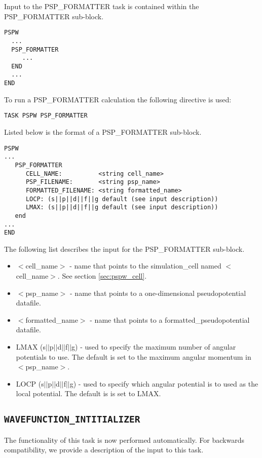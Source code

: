 Input to the PSP\_FORMATTER task is contained
within the PSP\_FORMATTER sub-block.
\begin{verbatim}
PSPW
  ...
  PSP_FORMATTER
     ...
  END
  ...
END
\end{verbatim}
To run a PSP\_FORMATTER calculation the following directive is used:
\begin{verbatim}
TASK PSPW PSP_FORMATTER
\end{verbatim}
Listed below is the format of a PSP\_FORMATTER sub-block.
\begin{verbatim}
PSPW
... 
   PSP_FORMATTER
      CELL_NAME:          <string cell_name> 
      PSP_FILENAME:       <string psp_name>
      FORMATTED_FILENAME: <string formatted_name>
      LOCP: (s||p||d||f||g default (see input description))
      LMAX: (s||p||d||f||g default (see input description))
   end
...
END
\end{verbatim}
The following list describes the input for the PSP\_FORMATTER
sub-block.
\begin{itemize}
        \item $<$cell\_name$>$ - name that points 
                to the simulation\_cell named $<$cell\_name$>$.  See section \ref{sec:pspw_cell}.
        \item $<$psp\_name$>$ - name that points
              to a one-dimensional pseudopotential datafile.
        \item $<$formatted\_name$>$ -  
              name that points to a formatted\_pseudopotential datafile.
        \item LMAX (s$||$p$||$d$||$f$||$g) - used to specify the maximum number
              of angular potentials to use. The default is set to the maximum
              angular momentum in $<$psp\_name$>$.
        \item LOCP (s$||$p$||$d$||$f$||$g) - used to specify which angular potential
              is to used as the local potential.  The default is is set to LMAX.
\end{itemize}



\subsection{\tt WAVEFUNCTION\_INTITIALIZER}
\label{sec:pspw_wavefunction_initializer}
The functionality of this task is now performed automatically. For backwards 
compatibility, we provide a description of the input to this task.

